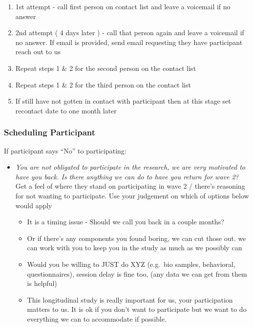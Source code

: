 \documentclass[
]{book}
\providecommand{\tightlist}{%
  \setlength{\itemsep}{0pt}\setlength{\parskip}{0pt}}
\begin{document}
\begin{enumerate}
\def\labelenumi{\arabic{enumi})}
\tightlist
\item
  1st attempt - call first person on contact list and leave a voicemail if no answer
\item
  2nd attempt ( 4 days later ) - call that person again and leave a voicemail if no answer. If email is provided, send email requesting they have participant reach out to us
\item
  Repeat steps 1 \& 2 for the second person on the contact list
\item
  Repeat steps 1 \& 2 for the third person on the contact list
\item
  If still have not gotten in contact with participant then at this stage set recontact date to one month later
\end{enumerate}

\hypertarget{scheduling-participant}{%
\subsubsection{Scheduling Participant}\label{scheduling-participant}}

If participant says ``No'' to participating:

\begin{itemize}
\item
  \emph{You are not obligated to participate in the research, we are very motivated to have you back. Is there anything we can do to have you return for wave 2? } Get a feel of where they stand on participating in wave 2 / there's reasoning for not wanting to participate. Use your judgement on which of options below would apply

  \begin{itemize}
  \item
    It is a timing issue - Should we call you back in a couple months?
  \item
    Or if there's any components you found boring, we can cut those out. we can work with you to keep you in the study as much as we possibly can
  \item
    Would you be willing to JUST do XYZ (e.g.~bio samples, behavioral, questionnaires), session delay is fine too, (any data we can get from them is helpful)
  \item
    This longitudinal study is really important for us, your participation matters to us. It is ok if you don't want to participate but we want to do everything we can to accommodate if possible.
  \end{itemize}
\end{itemize}
\end{document}
